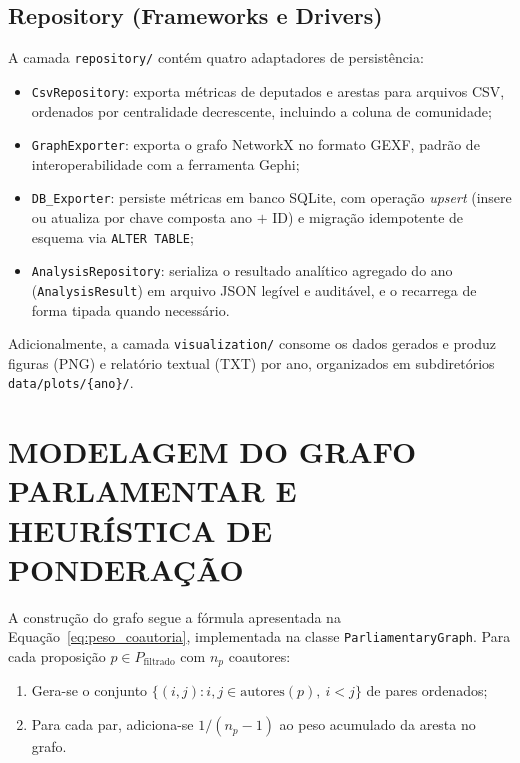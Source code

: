 \documentclass[
      12pt,
      a4paper,
      openright,
      oneside,
      chapter=TITLE,
      section=TITLE,
      english,
      french,
      spanish,
      brazilian
    ]{abntex2}
\begin{document}
    \subsection{Repository (Frameworks e Drivers)}
    
    A camada \texttt{repository/} contém quatro adaptadores de persistência:
    
    \begin{itemize}
        \item \texttt{CsvRepository}: exporta métricas de deputados e arestas para arquivos CSV, ordenados por centralidade decrescente, incluindo a coluna de comunidade;
        \item \texttt{GraphExporter}: exporta o grafo NetworkX no formato GEXF, padrão de interoperabilidade com a ferramenta Gephi;
        \item \texttt{DB\_Exporter}: persiste métricas em banco SQLite, com operação \textit{upsert} (insere ou atualiza por chave composta ano $+$ ID) e migração idempotente de esquema via \texttt{ALTER TABLE};
        \item \texttt{AnalysisRepository}: serializa o resultado analítico agregado do ano (\texttt{AnalysisResult}) em arquivo JSON legível e auditável, e o recarrega de forma tipada quando necessário.
    \end{itemize}
    
    Adicionalmente, a camada \texttt{visualization/} consome os dados gerados e produz figuras (PNG) e relatório textual (TXT) por ano, organizados em subdiretórios \texttt{data/plots/\{ano\}/}.
    
    \section{MODELAGEM DO GRAFO PARLAMENTAR E HEURÍSTICA DE PONDERAÇÃO}
    
    A construção do grafo segue a fórmula apresentada na Equação~\ref{eq:peso_coautoria}, implementada na classe \texttt{ParliamentaryGraph}. Para cada proposição $p \in P_{\text{filtrado}}$ com $n_p$ coautores:
    
    \begin{enumerate}
        \item Gera-se o conjunto $\{(i, j) : i, j \in \text{autores}(p),\ i < j\}$ de pares ordenados;
        \item Para cada par, adiciona-se $1/(n_p - 1)$ ao peso acumulado da aresta no grafo.
    \end{enumerate}
    
\end{document}
